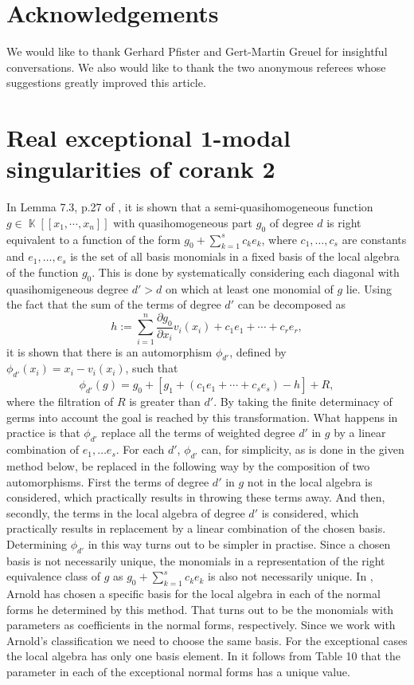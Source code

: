\documentclass[noend]{amsproc}
\theoremstyle{definition}
\DeclareMathOperator{\K}{\mathbb{K}}
\begin{document}
\section{Acknowledgements}

We would like to thank Gerhard Pfister and Gert-Martin Greuel for insightful
conversations. We also would like to thank the two anonymous referees whose
suggestions greatly improved this article.

\section{Real exceptional $\mathbf 1$-modal singularities of corank $\mathbf 2$}
\label{ExceptionalSingularities}
In Lemma 7.3, p.27 of \citet{A1974}, it is shown that a semi-quasihomogeneous function $g\in\K[[x_1,\cdots,x_n]]$ with quasihomogeneous part $g_0$ of degree $d$ is right equivalent to a function of the form $g_0+\sum_{k=1}^s c_ke_k$, where $c_1,\ldots, c_s$ are constants and $e_1,\ldots,e_s$ is the set of all basis monomials in a fixed basis of the local algebra of the function $g_0$. This is done by systematically considering each diagonal with quasihomigeneous degree $d'>d$ on which at least one monomial of $g$ lie. Using the fact that the sum of the terms of degree $d'$ can be decomposed as
\[h:=\sum_{i=1}^n\frac{\partial g_0}{\partial x_i}v_i(x_i)+c_1e_1+\cdots+c_re_r,\]
it is shown that there is an automorphism $\phi_{d'}$, defined by $\phi_{d'}(x_i)=x_i-v_i(x_i)$, such that
\[\phi_{d'}(g)=g_0+[g_1+(c_1e_1+\cdots +c_se_s)-h]+R,\]
where the filtration of $R$ is greater than $d'$. By taking the finite determinacy of germs into account the goal is reached by this transformation. What happens in practice is that $\phi_{d'}$ replace all the terms of weighted degree $d'$ in $g$ by a linear combination of $e_1,\ldots e_s$. For each $d'$, $\phi_{d'}$ can, for simplicity, as is done in the given method below, be replaced in the following way by the composition of two automorphisms. First the terms of degree $d'$ in $g$ not in the local algebra is considered, which practically results in throwing these terms away. And then, secondly, the terms in the local algebra of degree $d'$ is considered, which practically results in replacement by a linear combination of the chosen basis. Determining $\phi_{d'}$ in this way turns out to be simpler in practise. Since a chosen basis is not necessarily unique, the monomials in a representation of the right equivalence class of $g$ as $g_0+\sum_{k=1}^s c_ke_k$ is also not necessarily unique. In \cite{A1974}, Arnold has chosen a specific basis for the local algebra in each of the normal forms he determined by this method. That turns out to be the monomials with parameters as coefficients in the normal forms, respectively. Since we work with Arnold's classification we need to choose the same basis. For the exceptional cases the local algebra has only one basis element. In \cite{realclassify2} it follows from Table 10 that the parameter in each of the exceptional normal forms has a unique value. 
\end{document}
